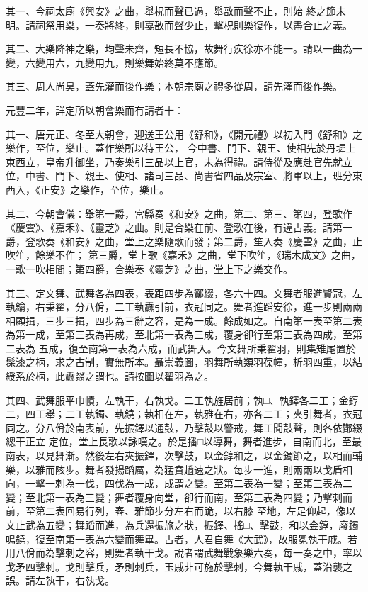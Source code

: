 \begin{pinyinscope}
 其一、今祠太廟《興安》之曲，舉柷而聲已過，舉敔而聲不止，則始
 終之節未明。請祠祭用樂，一奏將終，則戛敔而聲少止，擊柷則樂復作，以盡合止之義。



 其二、大樂降神之樂，均聲未齊，短長不協，故舞行疾徐亦不能一。請以一曲為一變，六變用六，九變用九，則樂舞始終莫不應節。



 其三、周人尚臭，蓋先灌而後作樂；本朝宗廟之禮多從周，請先灌而後作樂。



 元豐二年，詳定所以朝會樂而有請者十：



 其一、唐元正、冬至大朝會，迎送王公用《舒和》，《開元禮》以初入門《舒和》之樂作，至位，樂止。蓋作樂所以待王公，
 今中書、門下、親王、使相先於丹墀上東西立，皇帝升御坐，乃奏樂引三品以上官，未為得禮。請侍從及應赴官先就立位，中書、門下、親王、使相、諸司三品、尚書省四品及宗室、將軍以上，班分東西入，《正安》之樂作，至位，樂止。



 其二、今朝會儀：舉第一爵，宮縣奏《和安》之曲，第二、第三、第四，登歌作《慶雲》、《嘉禾》、《靈芝》之曲。則是合樂在前、登歌在後，有違古義。請第一爵，登歌奏《和安》之曲，堂上之樂隨歌而發；第二爵，笙入奏《慶雲》之曲，止吹笙，餘樂不作；
 第三爵，堂上歌《嘉禾》之曲，堂下吹笙，《瑞木成文》之曲，一歌一吹相間；第四爵，合樂奏《靈芝》之曲，堂上下之樂交作。



 其三、定文舞、武舞各為四表，表距四步為酇綴，各六十四。文舞者服進賢冠，左執鑰，右秉翟，分八佾，二工執纛引前，衣冠同之。舞者進蹈安徐，進一步則兩兩相顧揖，三步三揖，四步為三辭之容，是為一成。餘成如之。自南第一表至第二表為第一成，至第三表為再成，至北第一表為三成，覆身卻行至第三表為四成，至第二表為
 五成，復至南第一表為六成，而武舞入。今文舞所秉翟羽，則集雉尾置於髹漆之柄，求之古制，實無所本。聶崇義圖，羽舞所執類羽葆幢，析羽四重，以結綬系於柄，此纛翳之謂也。請按圖以翟羽為之。



 其四、武舞服平巾幘，左執干，右執戈。二工執旌居前；執□、執鐸各二工；金錞二，四工舉；二工執鐲、執鐃；執相在左，執雅在右，亦各二工；夾引舞者，衣冠同之。分八佾於南表前，先振鐸以通鼓，乃擊鼓以警戒，舞工聞鼓聲，則各依酇綴總干正立
 定位，堂上長歌以詠嘆之。於是播□以導舞，舞者進步，自南而北，至最南表，以見舞漸。然後左右夾振鐸，次擊鼓，以金錞和之，以金鐲節之，以相而輔樂，以雅而陔步。舞者發揚蹈厲，為猛賁趫速之狀。每步一進，則兩兩以戈盾相向，一擊一刺為一伐，四伐為一成，成謂之變。至第二表為一變；至第三表為二變；至北第一表為三變；舞者覆身向堂，卻行而南，至第三表為四變；乃擊刺而前，至第二表回易行列，舂、雅節步分左右而跪，以右膝
 至地，左足仰起，像以文止武為五變；舞蹈而進，為兵還振旅之狀，振鐸、搖□、擊鼓，和以金錞，廢鐲鳴鐃，復至南第一表為六變而舞畢。古者，人君自舞《大武》，故服冕執干戚。若用八佾而為擊刺之容，則舞者執干戈。說者謂武舞戰象樂六奏，每一奏之中，率以戈矛四擊刺。戈則擊兵，矛則刺兵，玉戚非可施於擊刺，今舞執干戚，蓋沿襲之誤。請左執干，右執戈。




\end{pinyinscope}
